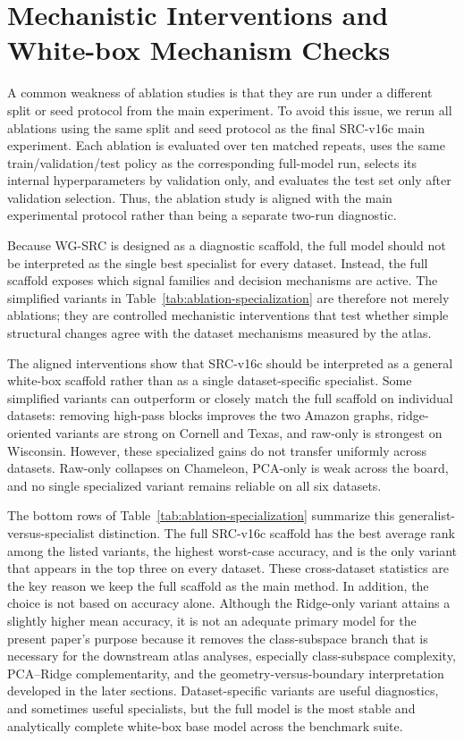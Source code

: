 \documentclass{article}
\newcommand{\SRC}{\textsc{WG-SRC}}
\begin{document}
\section{Mechanistic Interventions and White-box Mechanism Checks}
\label{sec:ablation-specialization}

A common weakness of ablation studies is that they are run under a different
split or seed protocol from the main experiment. To avoid this issue, we rerun
all ablations using the same split and seed protocol as the final SRC-v16c
main experiment. Each ablation is evaluated over ten matched repeats, uses the
same train/validation/test policy as the corresponding full-model run, selects
its internal hyperparameters by validation only, and evaluates the test set
only after validation selection. Thus, the ablation study is aligned with the
main experimental protocol rather than being a separate two-run diagnostic.

Because \SRC{} is designed as a diagnostic scaffold, the full model should not
be interpreted as the single best specialist for every dataset. Instead, the
full scaffold exposes which signal families and decision mechanisms are active.
The simplified variants in Table~\ref{tab:ablation-specialization} are
therefore not merely ablations; they are controlled mechanistic interventions
that test whether simple structural changes agree with the dataset mechanisms
measured by the atlas.



The aligned interventions show that SRC-v16c should be interpreted as a
general white-box scaffold rather than as a single dataset-specific specialist.
Some simplified variants can outperform or closely match the full scaffold on
individual datasets: removing high-pass blocks improves the two Amazon graphs,
ridge-oriented variants are strong on Cornell and Texas, and raw-only is
strongest on Wisconsin. However, these specialized gains do not transfer
uniformly across datasets. Raw-only collapses on Chameleon, PCA-only is weak
across the board, and no single specialized variant remains reliable on all
six datasets.

The bottom rows of Table~\ref{tab:ablation-specialization} summarize this
generalist-versus-specialist distinction. The full SRC-v16c scaffold has the
best average rank among the listed variants, the highest worst-case accuracy,
and is the only variant that appears in the top three on every dataset. These
cross-dataset statistics are the key reason we keep the full scaffold as the
main method. In addition, the choice is not based on accuracy alone. Although
the Ridge-only variant attains a slightly higher mean accuracy, it is not an
adequate primary model for the present paper's purpose because it removes the
class-subspace branch that is necessary for the downstream atlas analyses,
especially class-subspace complexity, PCA--Ridge complementarity, and the
geometry-versus-boundary interpretation developed in the later sections.
Dataset-specific variants are useful diagnostics, and sometimes useful
specialists, but the full model is the most stable and analytically complete
white-box base model across the benchmark suite.
\end{document}
